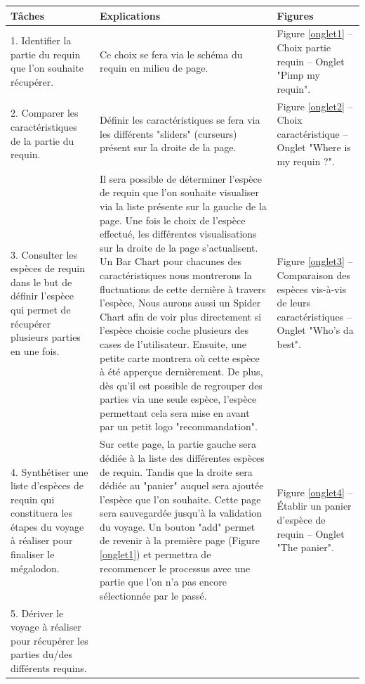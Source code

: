 \documentclass{article}
\begin{document}
\begin{center}
	\begin{tabular}{|p{3.5cm}|p{7cm}|p{3.5cm}|}
		\hline
		Tâches
		 &
		Explications
		 &
		Figures
		\\\hline
		1. Identifier la partie du requin que l’on souhaite récupérer.
		 &
		Ce choix se fera via le schéma du requin en milieu de page.
		 &

		Figure \ref{onglet1} – Choix partie requin – Onglet "Pimp my requin".
		\\\hline
		2. Comparer les caractéristiques de la partie du requin.
		 &
		Définir les caractéristiques se fera via les différents "sliders" (curseurs) présent sur la droite de la page.
		 &
		Figure \ref{onglet2} – Choix caractéristique – Onglet "Where is my requin ?".
		\\\hline
		3. Consulter les espèces de requin dans le but de définir l’espèce qui permet de récupérer plusieurs parties en une fois.
		 &
		Il sera possible de déterminer l’espèce de requin que l’on souhaite visualiser via la liste présente sur la gauche de la page. Une fois le choix de l’espèce effectué, les différentes visualisations sur la droite de la page s'actualisent. Un Bar Chart pour chacunes des caractéristiques nous montrerons la fluctuations de cette dernière à travers l'espèce, Nous aurons aussi un Spider Chart afin de voir plus directement si l'espèce choisie coche plusieurs des cases de l'utilisateur. Ensuite, une petite carte montrera où cette espèce à été apperçue dernièrement. De plus, dès qu'il est possible de regrouper des parties via une seule espèce, l'espèce permettant cela sera mise en avant par un petit logo "recommandation".
		 &
		Figure \ref{onglet3} – Comparaison des espèces vis-à-vis de leurs caractéristiques – Onglet "Who's da best".
		\\\hline
		4. Synthétiser une liste d’espèces de requin qui constituera les étapes du voyage à réaliser pour finaliser le mégalodon.
		 &
		Sur cette page, la partie gauche sera dédiée à la liste des différentes espèces de requin. Tandis que la droite sera dédiée au "panier" auquel sera ajoutée l’espèce que l’on souhaite. Cette page sera sauvegardée jusqu’à la validation du voyage. Un bouton "add" permet de revenir à la première page (Figure \ref{onglet1}) et permettra de recommencer le processus avec une partie que l’on n'a pas encore sélectionnée par le passé.
		 &
		Figure \ref{onglet4} – Établir un panier d’espèce de requin – Onglet "The panier".
		\\\hline
		5. Dériver le voyage à réaliser pour récupérer les parties du/des différents requins.

\end{tabular}
\end{center}
\end{document}
